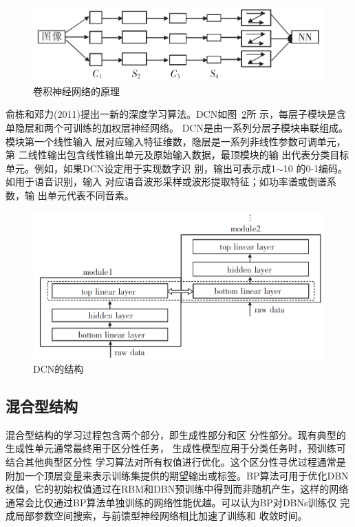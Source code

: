 \documentclass[UTF8]{article}
\begin{document}
	\begin{figure}[H]
	\centering
	\includegraphics[scale = 0.4]{Figures/5.png} 
	\caption{卷积神经网络的原理}
	\label{fig:p5}
	\end{figure}
	
	俞栋和邓力(2011)\cite{v8}提出一新的深度学习算法。DCN如图~\ref{fig:p6}所
	示，每层子模块是含单隐层和两个可训练的加权层神经网络。
	DCN是由一系列分层子模块串联组成。模块第一个线性输入
	层对应输入特征维数，隐层是一系列非线性参数可调单元，第
	二线性输出包含线性输出单元及原始输入数据，最顶模块的输
	出代表分类目标单元。例如，如果DCN设定用于实现数字识
	别，输出可表示成1$\sim$10 的0-1编码。如用于语音识别，输入
	对应语音波形采样或波形提取特征；如功率谱或倒谱系数，输
	出单元代表不同音素。
	
	\begin{figure}[H]
	\centering
	\includegraphics[scale = 0.4]{Figures/6.png} 
	\caption{DCN的结构}
	\label{fig:p6}
	\end{figure}
	
	\subsection{混合型结构}
	混合型结构的学习过程包含两个部分，即生成性部分和区
	分性部分。现有典型的生成性单元通常最终用于区分性任务，
	生成性模型应用于分类任务时，预训练可结合其他典型区分性
	学习算法对所有权值进行优化。这个区分性寻优过程通常是
	附加一个顶层变量来表示训练集提供的期望输出或标签。BP算法可用于优化DBN权值，它的初始权值通过在RBM和DBN预训练中得到而非随机产生，这样的网络通常会比仅通过BP算法单独训练的网络性能优越。可以认为BP对DBNs训练仅
	完成局部参数空间搜索，与前馈型神经网络相比加速了训练和
	收敛时间。
	
\end{document}
